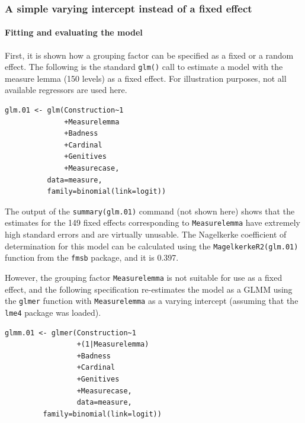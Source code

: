 \subsubsection{A simple varying intercept instead of a fixed effect}

\paragraph{Fitting and evaluating the model}

First, it is shown how a grouping factor can be specified as a fixed or a random effect.
The following is the standard \texttt{glm()} call to estimate a model with the measure lemma (150 levels) as a fixed effect.
For illustration purposes, not all available regressors are used here.

\vspace{0.5\baselineskip}

\begin{lstlisting}
glm.01 <- glm(Construction~1
              +Measurelemma
              +Badness
              +Cardinal
              +Genitives
              +Measurecase,
	      data=measure,
	      family=binomial(link=logit))
\end{lstlisting}

The output of the \texttt{summary(glm.01)} command (not shown here) shows that the estimates for the 149 fixed effects corresponding to \texttt{Measurelemma} have extremely high standard errors and are virtually unusable.
The Nagelkerke coefficient of determination for this model can be calculated using the \texttt{MagelkerkeR2(glm.01)} function from the \texttt{fmsb} package, and it is 0.397.

However, the grouping factor \texttt{Measurelemma} is not suitable for use as a fixed effect, and the following specification re-estimates the model as a GLMM using the \texttt{glmer} function with \texttt{Measurelemma} as a varying intercept (assuming that the \texttt{lme4} package was loaded).

\vspace{0.5\baselineskip}

\begin{lstlisting}
glmm.01 <- glmer(Construction~1
                 +(1|Measurelemma)
                 +Badness
                 +Cardinal
                 +Genitives
                 +Measurecase,
                 data=measure,
		 family=binomial(link=logit))
\end{lstlisting}

